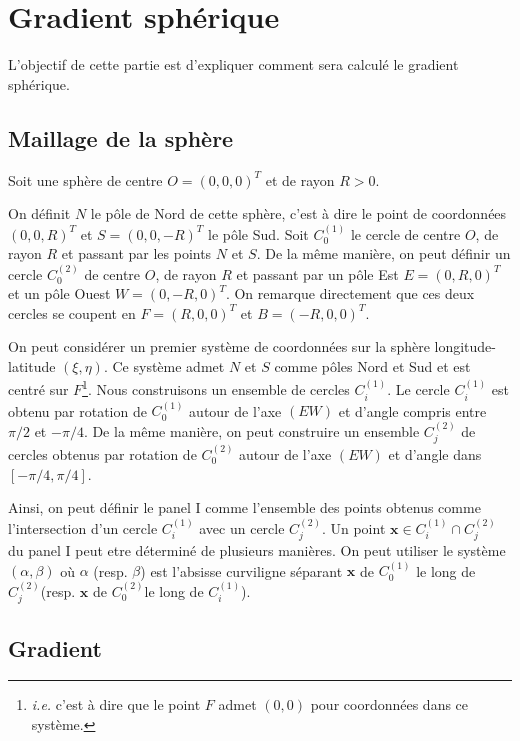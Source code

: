 \section{Gradient sphérique}

L'objectif de cette partie est d'expliquer comment sera calculé le gradient sphérique.

\subsection{Maillage de la sphère}

Soit une sphère de centre $O = (0,0,0)^T$ et de rayon $R > 0$. 

On définit $N$ le p\^ole de Nord de cette sphère, c'est à dire le point de coordonnées $(0,0,R)^T$ et $S = (0,0,-R)^T$ le p\^ole Sud. Soit $C^{(1)}_0$ le cercle de centre $O$, de rayon $R$ et passant par les points $N$ et $S$. De la m\^eme manière, on peut définir un cercle $C^{(2)}_0$ de centre $O$, de rayon $R$ et passant par un p\^ole Est $E = (0,R,0)^T$ et un p\^ole Ouest $W = (0,-R,0)^T$. On remarque directement que ces deux cercles se coupent en $F = (R,0,0)^T$ et $B=(-R,0,0)^T$.

On peut considérer un premier système de coordonnées sur la sphère longitude-latitude $(\xi, \eta)$. Ce système admet $N$ et $S$ comme p\^oles Nord et Sud et est centré sur $F$\footnote{\textit{i.e.} c'est à dire que le point $F$ admet $(0,0)$ pour coordonnées dans ce système.}.
Nous construisons un ensemble de cercles $C^{(1)}_i$. Le cercle $C^{(1)}_i$ est obtenu par rotation de $C^{(1)}_0$ autour de l'axe $(EW)$ et d'angle compris entre $\pi/2$ et $-\pi/4$. De la m\^eme manière, on peut construire un ensemble $C^{(2)}_j$ de cercles obtenus par rotation de $C^{(2)}_0$ autour de l'axe $(EW)$ et d'angle dans $\left[ -\pi/4, \pi/4 \right]$.

Ainsi, on peut définir le panel I comme l'ensemble des points obtenus comme l'intersection d'un cercle $C^{(1)}_i$ avec un cercle $C^{(2)}_j$. Un point $\mathbf{x} \in C^{(1)}_i \cap C^{(2)}_j$du panel I peut etre déterminé de plusieurs manières. On peut utiliser le système $(\alpha, \beta)$ où $\alpha$ (resp. $\beta$) est l'absisse curviligne séparant $\mathbf{x}$ de $C^{(1)}_0$ le long de $C^{(2)}_j$(resp. $\mathbf{x}$ de $C^{(2)}_0$le long de $C^{(1)}_i$).



\subsection{Gradient}
